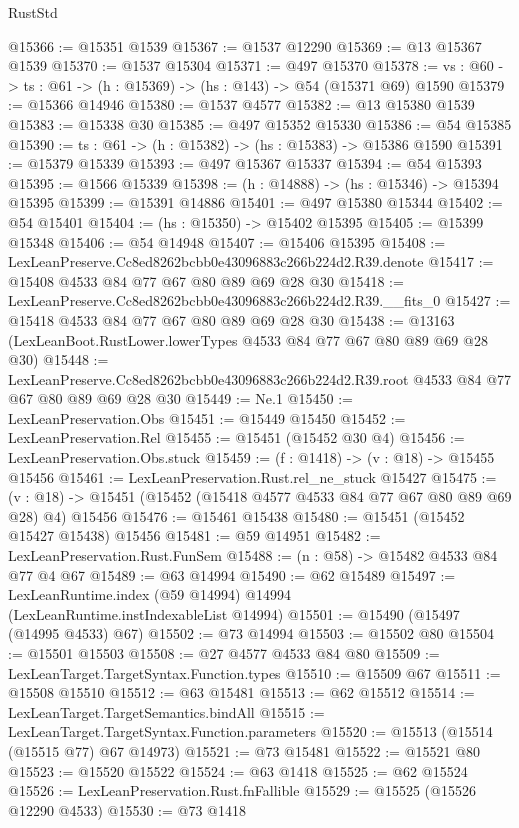 \begin{lexlean}{RustStd}
\begin{coremodule}
@15366 := @15351 @1539
@15367 := @1537 @12290
@15369 := @13 @15367 @1539
@15370 := @1537 @15304
@15371 := @497 @15370
@15378 := {vs : @60} -> {ts : @61} -> (h : @15369) -> (hs : @143) -> @54 (@15371 @69) @1590
@15379 := @15366 @14946
@15380 := @1537 @4577
@15382 := @13 @15380 @1539
@15383 := @15338 @30
@15385 := @497 @15352 @15330
@15386 := @54 @15385
@15390 := {ts : @61} -> (h : @15382) -> (hs : @15383) -> @15386 @1590
@15391 := @15379 @15339
@15393 := @497 @15367 @15337
@15394 := @54 @15393
@15395 := @1566 @15339
@15398 := (h : @14888) -> (hs : @15346) -> @15394 @15395
@15399 := @15391 @14886
@15401 := @497 @15380 @15344
@15402 := @54 @15401
@15404 := (hs : @15350) -> @15402 @15395
@15405 := @15399 @15348
@15406 := @54 @14948
@15407 := @15406 @15395
@15408 := LexLeanPreserve.Cc8ed8262bcbb0e43096883c266b224d2.R39.denote
@15417 := @15408 @4533 @84 @77 @67 @80 @89 @69 @28 @30
@15418 := LexLeanPreserve.Cc8ed8262bcbb0e43096883c266b224d2.R39.__fits_0
@15427 := @15418 @4533 @84 @77 @67 @80 @89 @69 @28 @30
@15438 := @13163 (LexLeanBoot.RustLower.lowerTypes @4533 @84 @77 @67 @80 @89 @69 @28 @30)
@15448 := LexLeanPreserve.Cc8ed8262bcbb0e43096883c266b224d2.R39.root
    @4533
    @84
    @77
    @67
    @80
    @89
    @69
    @28
    @30
@15449 := Ne.{1}
@15450 := LexLeanPreservation.Obs
@15451 := @15449 @15450
@15452 := LexLeanPreservation.Rel
@15455 := @15451 (@15452 @30 @4)
@15456 := LexLeanPreservation.Obs.stuck
@15459 := (f : @1418) -> (v : @18) -> @15455 @15456
@15461 := LexLeanPreservation.Rust.rel_ne_stuck @15427
@15475 := (v : @18) -> @15451 (@15452 (@15418 @4577 @4533 @84 @77 @67 @80 @89 @69 @28) @4) @15456
@15476 := @15461 @15438
@15480 := @15451 (@15452 @15427 @15438) @15456
@15481 := @59 @14951
@15482 := LexLeanPreservation.Rust.FunSem
@15488 := (n : @58) -> @15482 @4533 @84 @77 @4 @67
@15489 := @63 @14994
@15490 := @62 @15489
@15497 := LexLeanRuntime.index (@59 @14994) @14994 (LexLeanRuntime.instIndexableList @14994)
@15501 := @15490 (@15497 (@14995 @4533) @67)
@15502 := @73 @14994
@15503 := @15502 @80
@15504 := @15501 @15503
@15508 := @27 @4577 @4533 @84 @80
@15509 := LexLeanTarget.TargetSyntax.Function.types
@15510 := @15509 @67
@15511 := @15508 @15510
@15512 := @63 @15481
@15513 := @62 @15512
@15514 := LexLeanTarget.TargetSemantics.bindAll
@15515 := LexLeanTarget.TargetSyntax.Function.parameters
@15520 := @15513 (@15514 (@15515 @77) @67 @14973)
@15521 := @73 @15481
@15522 := @15521 @80
@15523 := @15520 @15522
@15524 := @63 @1418
@15525 := @62 @15524
@15526 := LexLeanPreservation.Rust.fnFallible
@15529 := @15525 (@15526 @12290 @4533)
@15530 := @73 @1418

\end{coremodule}
\end{lexlean}
